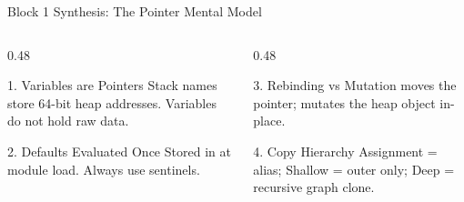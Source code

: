 \begin{frame}{Block 1 Synthesis: The Pointer Mental Model}
  \begin{columns}[T,onlytextwidth]
    \begin{column}{0.48\textwidth}
      \begin{ConceptBox}{1. Variables are Pointers}
        \scriptsize Stack names store 64-bit heap addresses. Variables do not hold raw data.
      \end{ConceptBox}
      \vspace{0.08cm}
      \begin{ConceptBox}{2. Defaults Evaluated Once}
        \scriptsize Stored in  at module load. Always use  sentinels.
      \end{ConceptBox}
    \end{column}
    \begin{column}{0.48\textwidth}
      \begin{ConceptBox}{3. Rebinding vs Mutation}
        \scriptsize \InlineCode{=} moves the pointer;  mutates the heap object in-place.
      \end{ConceptBox}
      \vspace{0.08cm}
      \begin{ConceptBox}{4. Copy Hierarchy}
        \scriptsize Assignment = alias; Shallow = outer only; Deep = recursive graph clone.
      \end{ConceptBox}
    \end{column}
  \end{columns}
  \vspace{0.10cm}
\end{frame}

